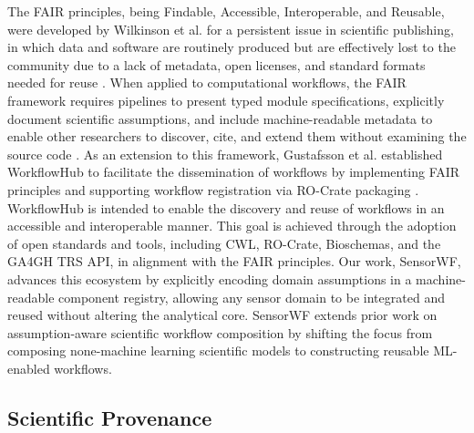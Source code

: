 \documentclass[conference]{IEEEtran}
\newcommand\Alex[1]{\leavevmode{\footnotesize\textbf{\hl{[Alex: #1]}}}}
\begin{document}
The FAIR principles, being Findable, Accessible, Interoperable, and Reusable, were developed by Wilkinson et al. for a persistent issue in scientific publishing, in which data and software are routinely produced but are effectively lost to the community due to a lack of metadata, open licenses, and standard formats needed for reuse \cite{wilkinson2016fair}. When applied to computational workflows, the FAIR framework requires pipelines to present typed module specifications, explicitly document scientific assumptions, and include machine-readable metadata to enable other researchers to discover, cite, and extend them without examining the source code \cite{garijo2022fair}. As an extension to this framework, Gustafsson et al. established WorkflowHub to facilitate the dissemination of workflows by implementing FAIR principles and supporting workflow registration via RO-Crate packaging \cite{gustafsson2025workflowhub}. WorkflowHub is intended to enable the discovery and reuse of workflows in an accessible and interoperable manner. This goal is achieved through the adoption of open standards and tools, including CWL, RO-Crate, Bioschemas, and the GA4GH TRS API, in alignment with the FAIR principles. Our work, SensorWF, advances this ecosystem by explicitly encoding domain assumptions in a machine-readable component registry, allowing any sensor domain to be integrated and reused without altering the analytical core. SensorWF extends prior work \cite{vargas-acosta_automating_2022,vargas_acosta_automated_2024,vargas-acosta_towards_2025} on assumption-aware scientific workflow composition by shifting the focus from composing none-machine learning scientific models to constructing reusable ML-enabled workflows.

\subsection{Scientific Provenance}
\end{document}
